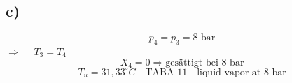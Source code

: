 

\subsection*{c)}
\[
p_4 = p_3 = 8 \text{ bar}
\]
 \(\Rightarrow\)  \(\quad T_3 = T_4\)
\[
X_4 = 0 \Rightarrow \text{gesättigt bei 8 bar}
\]
\[
T_u = 31,33^\circ C \quad \text{TABA-11} \quad \text{liquid-vapor at 8 bar}
\]